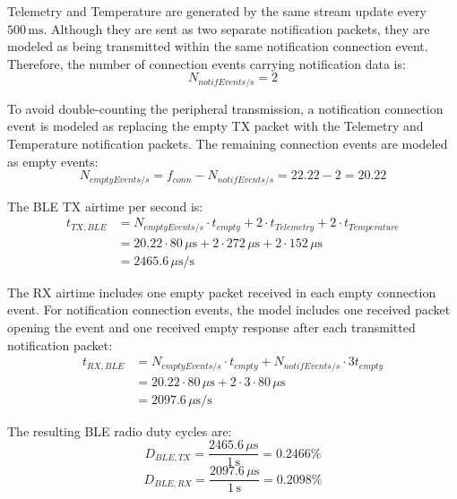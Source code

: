 Telemetry and Temperature are generated by the same stream update every \(500\,\mathrm{ms}\). 
Although they are sent as two separate notification packets, they are modeled as being transmitted within the same notification connection event. 
Therefore, the number of connection events carrying notification data is:
\begin{equation}
	N_{notifEvents/s} = 2
\end{equation}

To avoid double-counting the peripheral transmission, a notification connection event is modeled as replacing the empty TX packet with the Telemetry and Temperature notification packets. 
The remaining connection events are modeled as empty events:
\begin{equation}
	N_{emptyEvents/s} = f_{conn} - N_{notifEvents/s} = 22.22 - 2 = 20.22
\end{equation}

The BLE TX airtime per second is:
\begin{equation}
	\begin{aligned}
		t_{TX,BLE}
		&= N_{emptyEvents/s} \cdot t_{empty} + 2 \cdot t_{Telemetry} + 2 \cdot t_{Temperature} \\
		&= 20.22 \cdot 80\,\mu\mathrm{s} + 2 \cdot 272\,\mu\mathrm{s} + 2 \cdot 152\,\mu\mathrm{s} \\
		&= 2465.6\,\mu\mathrm{s/s}
	\end{aligned}
\end{equation}

The RX airtime includes one empty packet received in each empty connection event. 
For notification connection events, the model includes one received packet opening the event and one received empty response after each transmitted notification packet:
\begin{equation}
	\begin{aligned}
		t_{RX,BLE}
		&= N_{emptyEvents/s} \cdot t_{empty} + N_{notifEvents/s} \cdot 3t_{empty} \\
		&= 20.22 \cdot 80\,\mu\mathrm{s} + 2 \cdot 3 \cdot 80\,\mu\mathrm{s} \\
		&= 2097.6\,\mu\mathrm{s/s}
	\end{aligned}
\end{equation}

The resulting BLE radio duty cycles are:
\begin{equation}
	D_{BLE,TX} = \frac{2465.6\,\mu\mathrm{s}}{1\,\mathrm{s}} = 0.2466\%
\end{equation}
\begin{equation}
	D_{BLE,RX} = \frac{2097.6\,\mu\mathrm{s}}{1\,\mathrm{s}} = 0.2098\%
\end{equation}



